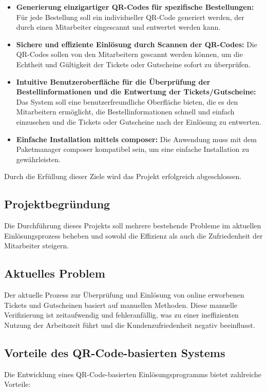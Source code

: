 \begin{itemize}
    \item \textbf{Generierung einzigartiger QR-Codes für spezifische Bestellungen:} Für jede Bestellung soll ein individueller QR-Code generiert werden, der durch einen Mitarbeiter eingescannt und entwertet werden kann.
    \item \textbf{Sichere und effiziente Einlösung durch Scannen der QR-Codes:} Die QR-Codes sollen von den Mitarbeitern gescannt werden können, um die Echtheit und Gültigkeit der Tickets oder Gutscheine sofort zu überprüfen.
    \item \textbf{Intuitive Benutzeroberfläche für die Überprüfung der Bestellinformationen und die Entwertung der Tickets/Gutscheine:} Das System soll eine benutzerfreundliche Oberfläche bieten, die es den Mitarbeitern ermöglicht, die Bestellinformationen schnell und einfach einzusehen und die Tickets oder Gutscheine nach der Einlösung zu entwerten.
	\item \textbf{Einfache Installation mittels composer:} Die Anwendung muss mit dem Paketmanager composer kompatibel sein, um eine einfache Installation zu gewährleisten.
\end{itemize}

Durch die Erfüllung dieser Ziele wird das Projekt erfolgreich abgeschlossen.

\subsection{Projektbegründung} 
\label{sec:Projektbegruendung}

Die Durchführung dieses Projekts soll mehrere bestehende Probleme im aktuellen Einlösungsprozess beheben und sowohl die Effizienz als auch die Zufriedenheit der Mitarbeiter steigern.

\subsection{Aktuelles Problem}
Der aktuelle Prozess zur Überprüfung und Einlösung von online erworbenen Tickets und Gutscheinen basiert auf manuellen Methoden. Diese manuelle Verifizierung ist zeitaufwendig und fehleranfällig, was zu einer ineffizienten Nutzung der Arbeitszeit führt und die Kundenzufriedenheit negativ beeinflusst.

\subsection{Vorteile des QR-Code-basierten Systems}
Die Entwicklung eines QR-Code-basierten Einlösungsprogramms bietet zahlreiche Vorteile:

